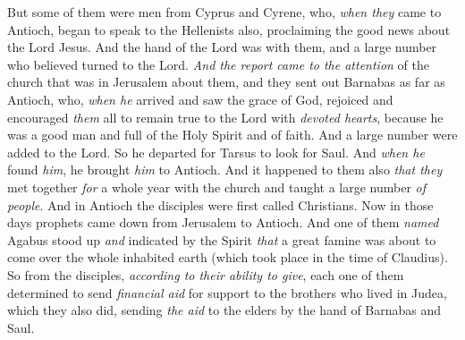 \begin{biblechapter}
\verse But some of them were men from Cyprus and Cyrene, who, \textit{when they} came to Antioch, began to speak to the Hellenists also, proclaiming the good news about the Lord Jesus.
\verse And the hand of the Lord was with them, and a large number who believed turned to the Lord.
\verse \textit{And the report came to the attention} of the church that was in Jerusalem about them, and they sent out Barnabas as far as Antioch,
\verse who, \textit{when he} arrived and saw the grace of God, rejoiced and encouraged \textit{them} all to remain true to the Lord with \textit{devoted hearts},
\verse because he was a good man and full of the Holy Spirit and of faith. And a large number were added to the Lord.
\verse So he departed for Tarsus to look for Saul.
\verse And \textit{when he} found \textit{him}, he brought \textit{him} to Antioch. And it happened to them also \textit{that they} met together \textit{for} a whole year with the church and taught a large number \textit{of people}. And in Antioch the disciples were first called Christians.
\verse Now in those days prophets came down from Jerusalem to Antioch.
\verse And one of them \textit{named} Agabus stood up \textit{and} indicated by the Spirit \textit{that} a great famine was about to come over the whole inhabited earth (which took place in the time of Claudius).
\verse So from the disciples, \textit{according to their ability to give}, each one of them determined to send \textit{financial aid} for support to the brothers who lived in Judea,
\verse which they also did, sending \textit{the aid} to the elders by the hand of Barnabas and Saul.
\end{biblechapter}

